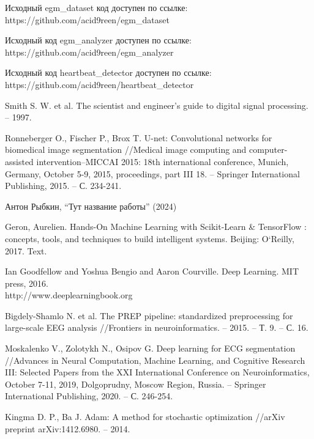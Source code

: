 \begingroup
\begin{thebibliography}{00}
    Исходный egm\_dataset код доступен по ссылке: https://github.com/acid9reen/egm\_dataset

    Исходный код egm\_analyzer доступен по ссылке: https://github.com/acid9reen/egm\_analyzer

    Исходный код heartbeat\_detector доступен по ссылке:\\
    https://github.com/acid9reen/heartbeat\_detector

    Smith S. W. et al. The scientist and engineer's guide to digital signal processing. -- 1997.

    Ronneberger O., Fischer P., Brox T. U-net: Convolutional networks for
    biomedical image segmentation //Medical image computing and
    computer-assisted intervention–MICCAI 2015: 18th international conference,
    Munich, Germany, October 5-9, 2015, proceedings, part III 18. – Springer
    International Publishing, 2015. – С. 234-241.

    Антон Рыбкин, ``Тут название работы'' (2024)

    Geron, Aurelien. Hands-On Machine Learning with Scikit-Learn \& TensorFlow
    : concepts, tools, and techniques to build intelligent systems. Beijing:
    O`Reilly, 2017. Text.

    Ian Goodfellow and Yoshua Bengio and Aaron Courville. Deep Learning. MIT
    press, 2016.\\ http://www.deeplearningbook.org

    Bigdely-Shamlo N. et al. The PREP pipeline: standardized preprocessing for
    large-scale EEG analysis //Frontiers in neuroinformatics. – 2015. – Т. 9. –
    С. 16.

    Moskalenko V., Zolotykh N., Osipov G. Deep learning for ECG segmentation
    //Advances in Neural Computation, Machine Learning, and Cognitive Research
    III: Selected Papers from the XXI International Conference on
    Neuroinformatics, October 7-11, 2019, Dolgoprudny, Moscow Region, Russia. –
    Springer International Publishing, 2020. – С. 246-254.

    Kingma D. P., Ba J. Adam: A method for stochastic optimization //arXiv
    preprint arXiv:1412.6980. – 2014.


\end{thebibliography}
